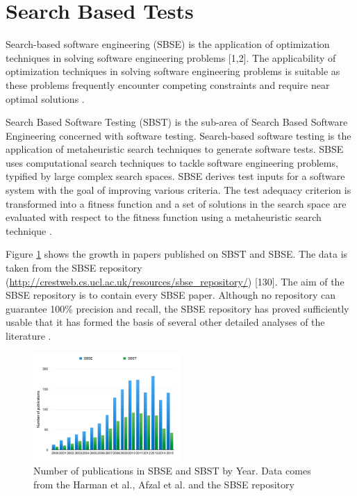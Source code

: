 \documentclass[review]{elsarticle}
\begin{document}
\section{Search Based Tests}

Search-based software engineering (SBSE) is the application of optimization techniques in solving software engineering problems [1,2]. The applicability of optimization techniques in solving software engineering problems is suitable as these problems frequently encounter competing constraints and require near optimal solutions \cite{Afzal2009a} \cite{Harman2015}. 


Search Based Software Testing (SBST) is the sub-area of Search Based Software Engineering concerned with software testing. Search-based software testing is the application of metaheuristic search techniques to generate software tests. SBSE uses computational search techniques to tackle software engineering problems, typified by large complex search spaces. SBSE derives test inputs for a software system with the goal of improving various criteria. The test adequacy criterion is transformed into a fitness function and a set of solutions in the search space are evaluated with respect to the fitness function using a metaheuristic search technique \cite{Afzal2009a} \cite{Aleti2016} \cite{Harman2015}.


Figure \ref{fig:sbsesbst}  shows the growth in papers published on SBST and SBSE. The data is taken from the SBSE repository (\url{http://crestweb.cs.ucl.ac.uk/resources/sbse_repository/}) [130]. 
The aim of the SBSE repository is to contain every SBSE paper. Although no repository can guarantee 100\% precision and recall, the SBSE repository has proved sufficiently usable that it has formed the basis of several other detailed analyses of the literature \cite{Harman2015}. 


\begin{figure}[h]
\includegraphics[width=0.5\textwidth]{./images/publications1.png}
\caption{Number of publications in SBSE and SBST by Year. Data comes from the Harman et al., Afzal et al. and the SBSE repository  \cite{Afzal2009a} \cite{Harman2015}}
\label{fig:sbsesbst}
\end{figure}
\end{document}
